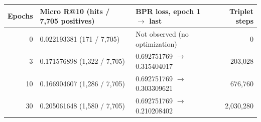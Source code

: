 \begin{tabularx}{\linewidth}{@{}rXXr@{}}
\toprule
Epochs & Micro R@10 (hits / 7,705 positives) & BPR loss, epoch 1 $\rightarrow$ last & Triplet steps\\
\midrule
0 & 0.022193381 (171 / 7,705) & Not observed (no optimization) & 0\\
3 & 0.171576898 (1,322 / 7,705) & 0.692751769 $\rightarrow$ 0.315404017 & 203,028\\
10 & 0.166904607 (1,286 / 7,705) & 0.692751769 $\rightarrow$ 0.303309621 & 676,760\\
30 & 0.205061648 (1,580 / 7,705) & 0.692751769 $\rightarrow$ 0.210208402 & 2,030,280\\
\bottomrule
\end{tabularx}